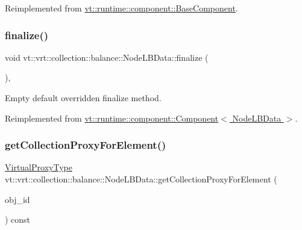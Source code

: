 Reimplemented from \hyperlink{structvt_1_1runtime_1_1component_1_1_base_component_a43eeed44aa64c77f5491abb4f5a39e9a}{vt\+::runtime\+::component\+::\+Base\+Component}.

\mbox{\label{structvt_1_1vrt_1_1collection_1_1balance_1_1_node_l_b_data_ac62cac77080f79e73e303c42ad850155}} 
\subsubsection{\texorpdfstring{finalize()}{finalize()}}
{\footnotesize\ttfamily void vt\+::vrt\+::collection\+::balance\+::\+Node\+L\+B\+Data\+::finalize (\begin{DoxyParamCaption}{ }\end{DoxyParamCaption})\hspace{0.3cm}{\ttfamily [override]}, {\ttfamily [virtual]}}



Empty default overridden finalize method. 



Reimplemented from \hyperlink{structvt_1_1runtime_1_1component_1_1_component_a098e362de01af6054e5491fba671a959}{vt\+::runtime\+::component\+::\+Component$<$ Node\+L\+B\+Data $>$}.

\mbox{\label{structvt_1_1vrt_1_1collection_1_1balance_1_1_node_l_b_data_a7f815606907a31f74428f058c220bf54}} 
\subsubsection{\texorpdfstring{get\+Collection\+Proxy\+For\+Element()}{getCollectionProxyForElement()}}
{\footnotesize\ttfamily \hyperlink{namespacevt_a1b417dd5d684f045bb58a0ede70045ac}{Virtual\+Proxy\+Type} vt\+::vrt\+::collection\+::balance\+::\+Node\+L\+B\+Data\+::get\+Collection\+Proxy\+For\+Element (\begin{DoxyParamCaption}\item[{\hyperlink{namespacevt_1_1vrt_1_1collection_1_1balance_a9f5b53fafb270212279a4757d2c4cd28}{Element\+I\+D\+Struct}}]{obj\+\_\+id }\end{DoxyParamCaption}) const}



